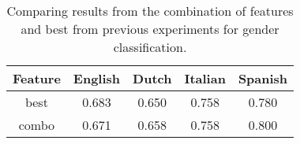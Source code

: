 \documentclass[a4paper]{llncs}
\begin{document}
\begin{table}[!htbp]
\centering
\begin{tabular}{|c|cccc|}
\hline
Feature & English & Dutch & Italian & Spanish \\ \hline
best    & 0.683   & 0.650 & 0.758   & 0.780   \\ %
combo   & 0.671   & 0.658 & 0.758   & 0.800   \\ \hline
\end{tabular}
\caption{Comparing results from the combination of features and best from previous experiments for gender classification.}
\label{table:GenderBestCombo}
\end{table}
\end{document}
